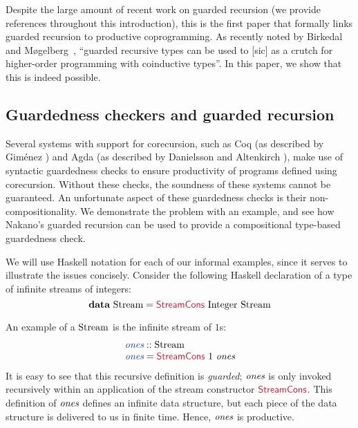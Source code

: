 Despite the large amount of recent work on guarded recursion (we
provide references throughout this introduction), this is the first
paper that formally links guarded recursion to productive
coprogramming. As recently noted by Birkedal and
M{\o}gelberg~\cite{birkedal13intensional}, ``guarded recursive types
can be used to [sic] as a crutch for higher-order programming with
coinductive types''. In this paper, we show that this is indeed
possible.

\subsection{Guardedness checkers and guarded recursion}

Several systems with support for corecursion, such as Coq (as
described by Gim{\'e}nez \cite{gimenez94codifying}) and Agda (as
described by Danielsson and Altenkirch \cite{danielsson09mixing}),
make use of syntactic guardedness checks to ensure productivity of
programs defined using corecursion. Without these checks, the
soundness of these systems cannot be guaranteed. An unfortunate aspect
of these guardedness checks is their non-compositionality. We
demonstrate the problem with an example, and see how Nakano's guarded
recursion can be used to provide a compositional type-based
guardedness check.

We will use Haskell notation for each of our informal examples, since
it serves to illustrate the issues concisely. Consider the following
Haskell declaration of a type of infinite streams of integers:
\begin{displaymath}
  \kw{data}\ \tyname{Stream} = \cons{StreamCons}\ \tyname{Integer}\ \tyname{Stream}
\end{displaymath}

An example of a $\textrm{Stream}$ is the infinite stream of $1$s:
\begin{displaymath}
  \begin{array}{l}
    \defn{ones} :: \tyname{Stream} \\
    \defn{ones} = \cons{StreamCons}\ 1\ \ident{ones}
  \end{array}
\end{displaymath}
It is easy to see that this recursive definition is \emph{guarded};
$\textit{ones}$ is only invoked recursively within an application of
the stream constructor $\cons{StreamCons}$. This definition of
$\textit{ones}$ defines an infinite data structure, but each piece of
the data structure is delivered to us in finite time. Hence,
$\textit{ones}$ is productive.

